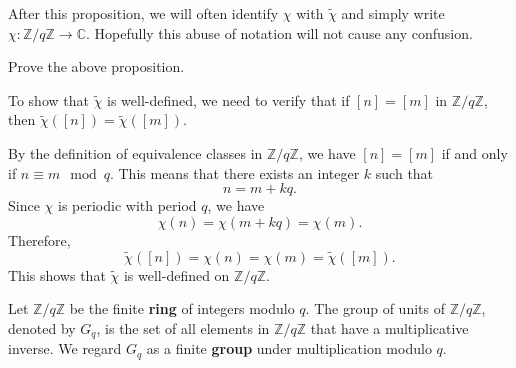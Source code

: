 \documentclass{elegantbook}
\begin{document}
\begin{note}
  After this proposition, we will often identify $\chi$ with $\widetilde{\chi}$ and simply write $\chi:\mathbb{Z}/q\mathbb{Z}\to\mathbb{C}$. Hopefully this abuse of notation will not cause any confusion.
\end{note}

\begin{exercise}
  Prove the above proposition.
\end{exercise}

\begin{solution}
  To show that $\widetilde{\chi}$ is well-defined, we need to verify that if $[n] = [m]$ in $\mathbb{Z}/q\mathbb{Z}$, then $\widetilde{\chi}([n]) = \widetilde{\chi}([m])$. 

  By the definition of equivalence classes in $\mathbb{Z}/q\mathbb{Z}$, we have $[n] = [m]$ if and only if $n \equiv m \mod q$. This means that there exists an integer $k$ such that
  \[
    n = m + kq.
  \]
  Since $\chi$ is periodic with period $q$, we have
  \[
    \chi(n) = \chi(m + kq) = \chi(m).
  \]
  Therefore,
  \[
    \widetilde{\chi}([n]) = \chi(n) = \chi(m) = \widetilde{\chi}([m]).
  \]
  This shows that $\widetilde{\chi}$ is well-defined on $\mathbb{Z}/q\mathbb{Z}$.
\end{solution}

\begin{definition}
  Let $\mathbb{Z}/q\mathbb{Z}$ be the finite \textbf{ring} of integers modulo $q$. The group of units of $\mathbb{Z}/q\mathbb{Z}$, denoted by $G_q$, is the set of all elements in $\mathbb{Z}/q\mathbb{Z}$ that have a multiplicative inverse. We regard $G_q$ as a finite \textbf{group} under multiplication modulo $q$.
\end{definition}
\end{document}
